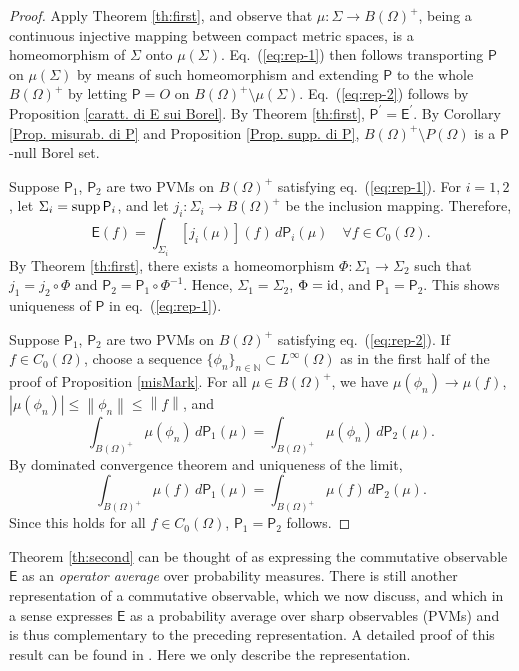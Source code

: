 \documentclass[12pt]{amsart}
\theoremstyle{definition}
\newcommand{\N}{\mathbb N} %
\newcommand{\no}[1]{\left\|#1\right\|} %
\newcommand{\nil}{O} %
\newcommand{\Eo}{\mathsf{E}} %
\newcommand{\PP}{\mathsf{P}} %
\newcommand{\linf}[1]{L^\infty \left( #1 \right)}
\newcommand{\supp}{{\rm supp}\,}
\newcommand{\de}{\, d}
\newcommand{\frecc}{\rightarrow}
\newcommand{\id}{{\rm id}} %
\begin{document}
\begin{proof}
Apply Theorem \ref{th:first}, and observe that $\mu : \Sigma \frecc B(\Omega)^+$, being a continuous injective mapping between compact metric spaces, is a homeomorphism of $\Sigma$ onto $\mu(\Sigma)$. Eq.~(\ref{eq:rep-1}) then follows transporting $\PP$ on $\mu(\Sigma)$ by means of such homeomorphism and extending $\PP$ to the whole $B(\Omega)^+$ by letting $\PP = \nil$ on $B(\Omega)^+\setminus \mu(\Sigma)$. Eq.~(\ref{eq:rep-2}) follows by Proposition \ref{caratt. di E sui Borel}. By Theorem \ref{th:first}, $\PP^\prime = \Eo^\prime$. By Corollary \ref{Prop. misurab. di P} and Proposition \ref{Prop. supp. di P}, $B(\Omega)^+ \setminus P(\Omega)$ is a $\PP$-null Borel set.

Suppose $\PP_1$, $\PP_2$ are two PVMs on $B(\Omega)^+$ satisfying eq.~(\ref{eq:rep-1}). For $i=1,2$, let $\Sigma_i = \supp \PP_i$, and let $j_i : \Sigma_i \frecc B(\Omega)^+$ be the inclusion mapping. Therefore,
$$
\Eo (f) = \int_{\Sigma_i} [j_i (\mu) ] (f) \de \PP_i (\mu) \quad \forall f\in C_0 (\Omega) .
$$
By Theorem \ref{th:first}, there exists a homeomorphism $\Phi : \Sigma_1 \frecc \Sigma_2$ such that $j_1 = j_2 \circ \Phi$ and $\PP_2 = \PP_1 \circ \Phi^{-1}$. Hence, $\Sigma_1 = \Sigma_2$, $\Phi = \id$, and $\PP_1 = \PP_2$. This shows uniqueness of $\PP$ in eq.~(\ref{eq:rep-1}).

Suppose $\PP_1$, $\PP_2$ are two PVMs on $B(\Omega)^+$ satisfying eq.~(\ref{eq:rep-2}). If $f\in C_0 (\Omega)$, choose a sequence $\{ \phi_n \}_{n\in \N} \subset \linf{\Omega}$ as in the first half of the proof of Proposition \ref{misMark}. For all $\mu\in B(\Omega)^+$, we have $\mu(\phi_n) \to \mu(f)$, $|\mu(\phi_n)| \leq \no{\phi_n} \leq \no{f}$, and
$$
\int_{B(\Omega)^+} \mu(\phi_n) \de \PP_1 (\mu) = \int_{B(\Omega)^+} \mu(\phi_n) \de \PP_2 (\mu) .
$$
By dominated convergence theorem and uniqueness of the limit,
$$
\int_{B(\Omega)^+} \mu(f) \de \PP_1 (\mu) = \int_{B(\Omega)^+} \mu(f) \de \PP_2 (\mu) .
$$
Since this holds for all $f\in C_0 (\Omega)$, $\PP_1 = \PP_2$ follows.
\end{proof}

Theorem \ref{th:second} can be thought of as expressing the commutative observable 
$\Eo$ as an {\em operator average} over probability measures. There is still another 
representation of a commutative observable, which we now discuss, and which in a sense 
expresses $\Eo$ as a probability average over sharp observables (PVMs) and is thus 
complementary to the preceding  representation.  A detailed 
proof of this result can be found in \cite{Ali82,Ali84}. Here we only describe the 
representation.
\end{document}
